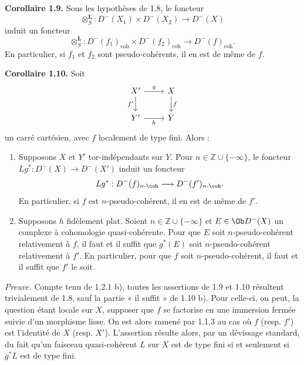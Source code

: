 \documentclass[11pt]{article}
\begin{document}
\textbf{Corollaire 1.9.} Sous les hypothèses de 1.8, le foncteur
\[
  \otimes_S^{\mathbf L}:D^{-}(X_1)\times D^{-}(X_2)\longrightarrow D^{-}(X)
\]
induit un foncteur
\[
  \otimes_S^{\mathbf L}:D^{-}(f_1)_{\mathrm{coh}}\times D^{-}(f_2)_{\mathrm{coh}}
  \longrightarrow D^{-}(f)_{\mathrm{coh}} .
\]
En particulier, si \(f_1\) et \(f_2\) sont pseudo-cohérents, il en est de même de \(f\).

\textbf{Corollaire 1.10.} Soit
\[
\begin{tikzcd}
X' \arrow[r,"g"] \arrow[d,"f'"'] & X \arrow[d,"f"]\\
Y' \arrow[r,"h"'] & Y
\end{tikzcd}
\]
un carré cartésien, avec \(f\) localement de type fini. Alors :
\begin{enumerate}[label=\alph*)]
\item Supposons \(X\) et \(Y'\) tor-indépendants sur \(Y\). Pour \(n\in\mathbb Z\cup\{-\infty\}\), le foncteur \(Lg^*:D^{-}(X)\to D^{-}(X')\) induit un foncteur
\[
  Lg^*:D^{-}(f)_{n\text{-}\coh}\longrightarrow D^{-}(f')_{n\text{-}\coh}.
\]
En particulier, si \(f\) est \(n\)-pseudo-cohérent, il en est de même de \(f'\).

\item Supposons \(h\) fidèlement plat. Soient \(n\in\mathbb Z\cup\{-\infty\}\) et \(E\in\Ob D^{-}(X)\) un complexe à cohomologie quasi-cohérente. Pour que \(E\) soit \(n\)-pseudo-cohérent relativement à \(f\), il faut et il suffit que \(g^*(E)\) soit \(n\)-pseudo-cohérent relativement à \(f'\). En particulier, pour que \(f\) soit \(n\)-pseudo-cohérent, il faut et il suffit que \(f'\) le soit.
\end{enumerate}

\emph{Preuve.} Compte tenu de 1.2.1 b), toutes les assertions de 1.9 et 1.10 résultent trivialement de 1.8, sauf la partie « il suffit » de 1.10 b). Pour celle-ci, on peut, la question étant locale sur \(X\), supposer que \(f\) se factorise en une immersion fermée suivie d'un morphisme lisse. On est alors ramené par 1.1.3 au cas où \(f\) (resp. \(f'\)) est l'identité de \(X\) (resp. \(X'\)). L'assertion résulte alors, par un dévissage standard, du fait qu'un faisceau quasi-cohérent \(L\) sur \(X\) est de type fini si et seulement si \(g^*L\) est de type fini.
\end{document}
